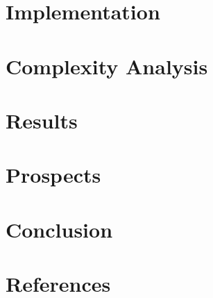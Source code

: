 \documentclass[12pt]{article}
\begin{document}
\section{Implementation}

\section{Complexity Analysis}

\section{Results}

\section{Prospects}

\section{Conclusion}

\newpage

\section{References}
\printbibliography
\end{document}
